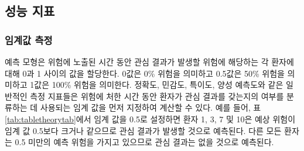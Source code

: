\documentclass[11pt]{book}
\theoremstyle{definition}
\theoremstyle{definition}
\theoremstyle{definition}
\theoremstyle{remark}
\begin{document}
\subsection{성능 지표}\label{performance}

\subsubsection*{임계값 측정}\label{-}

예측 모형은 위험에 노출된 시간 동안 관심 결과가 발생할 위험에 해당하는
각 환자에 대해 0과 1 사이의 값을 할당한다. 0값은 0\% 위험을 의미하고
0.5값은 50\% 위험을 의미하고 1값은 100\% 위험을 의미한다. 정확도,
민감도, 특이도, 양성 예측도와 같은 일반적인 측정 지표들은 위험에 처한
시간 동안 환자가 관심 결과를 갖는지의 여부를 분류하는 데 사용되는 임계
값을 먼저 지정하여 계산할 수 있다. 예를 들어, 표
\ref{tab:tabletheorytab}에서 임계 값을 0.5로 설정하면 환자 1, 3, 7 및
10은 예상 위험이 임계 값 0.5보다 크거나 같으므로 관심 결과가 발생할
것으로 예측된다. 다른 모든 환자는 0.5 미만의 예측 위험을 가지고 있으므로
관심 결과는 없을 것으로 예측된다. 
  
\end{document}
